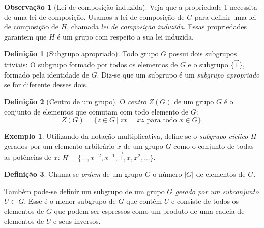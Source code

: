 \documentclass[a4paper,12pt]{report}
\theoremstyle{plain}
\theoremstyle{definition}
\newtheorem{definicao}{Definição}[section]
\newtheorem{observacao}{Observação}[section]
\newtheorem{exemplo}{Exemplo}[section]
\begin{document}
\begin{observacao}[Lei de composição induzida]
	Veja que a propriedade 1 necessita de uma lei de composição. Usamos a
	lei de composição de \(G\) para definir uma lei de composição de \(H\),
	chamada \emph{lei de composição induzida}. Essas propriedades garantem
	que \(H\) é um grupo com respeito a sua lei induzida.
\end{observacao}

\begin{definicao}[Subgrupo apropriado]
	Todo grupo \(G\) possui dois subgrupos triviais: O subgrupo formado por
	todos os elementos de \(G\) e o subgrupo \(\{\vec{1}\}\), formado pela
	identidade de \(G\). Diz-se que um subgrupo é um \emph{subgrupo apropriado} se for diferente desses dois.
\end{definicao}

\begin{definicao}[Centro de um grupo]
	O \emph{centro} \(Z(G)\) de um grupo \(G\) é o
	conjunto de elementos que comutam com todo elemento de \(G\):
	\[Z(G) = \{z \in G \ | \ zx = xz \text{ para todo } x \in G\}.\]
\end{definicao}

\begin{exemplo}
	Utilizando da notação multiplicativa, define-se o
	\emph{subgrupo cíclico \(H\)} gerados por um elemento arbitrário \(x\)
	de um grupo \(G\) como o conjunto de todas as potências de \(x\):
	\(H = \{\dots , x^{-2}, x^{-1},\vec{1},x,x^2,\dots\}\).
\end{exemplo}

\begin{definicao}
	Chama-se \emph{ordem} de um grupo \(G\) o número \(|G|\) de elementos de \(G\).
\end{definicao}

Também pode-se definir um subgrupo de um grupo \emph{\(G\) gerado por um
subconjunto \(U \subset G\)}. Esse é o menor subgrupo de \(G\) que
contém \(U\) e consiste de todos os elementos de \(G\) que podem ser
espressos como um produto de uma cadeia de elementos de \(U\) e seus
inversos.
\end{document}
